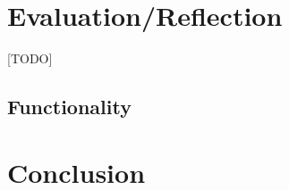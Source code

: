\documentclass[bsc,frontabs,twoside,singlespacing,parskip,deptreport]{infthesis}     %
\begin{document}
\chapter{Evaluation/Reflection}
    [TODO]

\section{Functionality}

\chapter{Conclusion}






\end{document}
